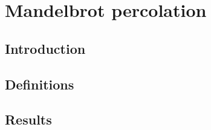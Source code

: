 
\chapter{Mandelbrot percolation} 

\label{ch:classicpercolation} %



\section{Introduction}\label{sec:introduction}



\section{Definitions}\label{sec:options}



\section{Results}\label{sec:results}
